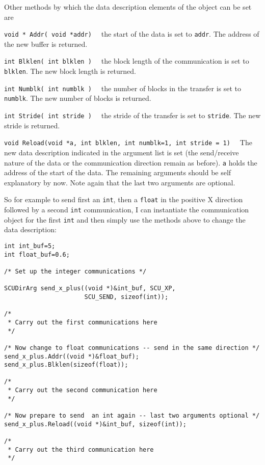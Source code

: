 Other methods by which the data description elements of the object can be
set are
\begin{description}
\item{\tt void * Addr( void *addr) \ }
the start of the data is set to {\tt addr}. The address of the new
buffer is returned.
\item{\tt int Blklen( int blklen ) \ }
the block length of the communication is set to {\tt blklen}. The 
new block length is returned.
\item{\tt int Numblk( int numblk ) \ }
the number of blocks in the transfer is set to {\tt numblk}. The new
number of blocks is returned.
\item{\tt int Stride( int stride ) \ } 
the stride of the transfer is set to {\tt stride}. The new stride is returned.
\item{\tt void Reload(void *a, int blklen, int numblk=1, int stride = 1) \ }
The new data description indicated in the argument list is set (the send/receive nature of the data or the communication direction remain as before). {\tt a} holds the address of the start of the data. The remaining arguments should be
self explanatory by now. Note again that the last two arguments are optional.
\end{description}

So for example to send first an {\tt int}, then a {\tt float} in the 
positive X direction followed by a second {\tt int} communication, I can 
instantiate the communication object for the first {\tt int}  and then simply
use the methods above to change the data description:
\begin{verbatim}
int int_buf=5;
int float_buf=0.6;

/* Set up the integer communications */

SCUDirArg send_x_plus((void *)&int_buf, SCU_XP, 
                      SCU_SEND, sizeof(int));

/* 
 * Carry out the first communications here 
 */

/* Now change to float communications -- send in the same direction */
send_x_plus.Addr((void *)&float_buf);
send_x_plus.Blklen(sizeof(float));
 
/* 
 * Carry out the second communication here
 */

/* Now prepare to send  an int again -- last two arguments optional */
send_x_plus.Reload((void *)&int_buf, sizeof(int));

/*
 * Carry out the third communication here
 */
\end{verbatim}

